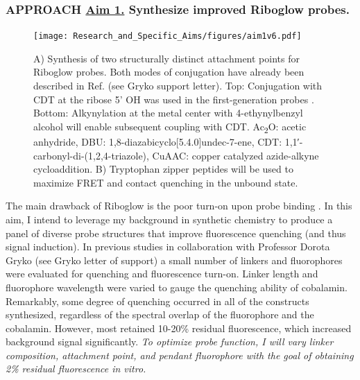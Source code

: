 \subsubsection*{APPROACH \underline{Aim 1.} Synthesize improved Riboglow probes.}
\begin{figure}
\vspace{-0.15in} %
\begin{centering}
\texttt{[image: Research\_and\_Specific\_Aims/figures/aim1v6.pdf]}
\end{centering}
\footnotesize
\caption{\label{figure:CblConstructs}
A) Synthesis of two structurally distinct attachment points for Riboglow probes. Both modes of conjugation have already been described in Ref. \cite{ChrominskiVitaminB12Derivatives2014} (see Gryko support letter). Top: Conjugation with CDT at the ribose 5' OH was used in the first-generation probes \cite{Braselmannmulticolorriboswitchbasedplatform2018}. Bottom: Alkynylation at the metal center with 4-ethynylbenzyl alcohol will enable subsequent coupling with CDT. Ac\textsubscript{2}O: acetic anhydride, DBU: 1,8-diazabicyclo[5.4.0]undec-7-ene, CDT: 1,1′-carbonyl-di-(1,2,4-triazole), CuAAC: copper catalyzed azide-alkyne cycloaddition. B) Tryptophan zipper peptides will be used to maximize FRET and contact quenching in the unbound state.
}
\end{figure}

The main drawback of Riboglow is the poor turn-on upon probe binding . In this aim, I intend to leverage my background in synthetic chemistry to produce a panel of diverse probe structures that improve fluorescence quenching (and thus signal induction). In previous studies in collaboration with Professor Dorota Gryko (see Gryko letter of support) a small number of linkers and fluorophores were evaluated for quenching and fluorescence turn-on. Linker length and fluorophore wavelength were varied to gauge the quenching ability of cobalamin. Remarkably, some degree of quenching occurred in all of the constructs synthesized, regardless of the spectral overlap of the fluorophore and the cobalamin. However, most retained 10-20\% residual fluorescence, which increased background signal significantly. \textit{To optimize probe function, I will vary linker composition, attachment point, and pendant fluorophore with the goal of obtaining 2\% residual fluorescence in vitro.}

